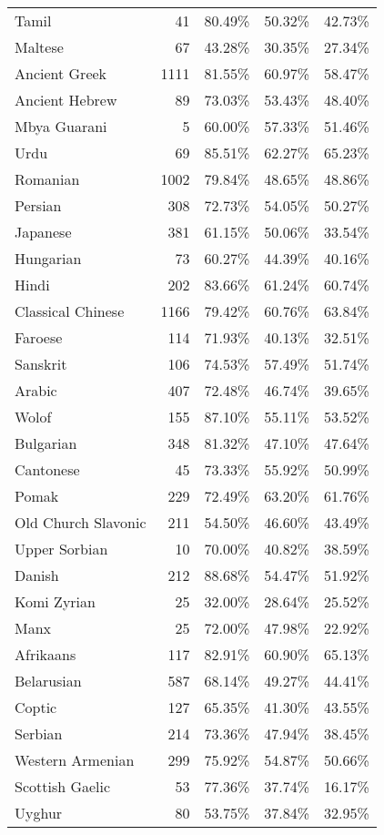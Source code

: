 \begin{longtable}{lrrrr}
    Tamil & 41 & 80.49\% & 50.32\% & 42.73\% \\
    Maltese & 67 & 43.28\% & 30.35\% & 27.34\% \\
    Ancient Greek & 1111 & 81.55\% & 60.97\% & 58.47\% \\
    Ancient Hebrew & 89 & 73.03\% & 53.43\% & 48.40\% \\
    Mbya Guarani & 5 & 60.00\% & 57.33\% & 51.46\% \\
    Urdu & 69 & 85.51\% & 62.27\% & 65.23\% \\
    Romanian & 1002 & 79.84\% & 48.65\% & 48.86\% \\
    Persian & 308 & 72.73\% & 54.05\% & 50.27\% \\
    Japanese & 381 & 61.15\% & 50.06\% & 33.54\% \\
    Hungarian & 73 & 60.27\% & 44.39\% & 40.16\% \\
    Hindi & 202 & 83.66\% & 61.24\% & 60.74\% \\
    Classical Chinese & 1166 & 79.42\% & 60.76\% & 63.84\% \\
    Faroese & 114 & 71.93\% & 40.13\% & 32.51\% \\
    Sanskrit & 106 & 74.53\% & 57.49\% & 51.74\% \\
    Arabic & 407 & 72.48\% & 46.74\% & 39.65\% \\
    Wolof & 155 & 87.10\% & 55.11\% & 53.52\% \\
    Bulgarian & 348 & 81.32\% & 47.10\% & 47.64\% \\
    Cantonese & 45 & 73.33\% & 55.92\% & 50.99\% \\
    Pomak & 229 & 72.49\% & 63.20\% & 61.76\% \\
    Old Church Slavonic & 211 & 54.50\% & 46.60\% & 43.49\% \\
    Upper Sorbian & 10 & 70.00\% & 40.82\% & 38.59\% \\
    Danish & 212 & 88.68\% & 54.47\% & 51.92\% \\
    Komi Zyrian & 25 & 32.00\% & 28.64\% & 25.52\% \\
    Manx & 25 & 72.00\% & 47.98\% & 22.92\% \\
    Afrikaans & 117 & 82.91\% & 60.90\% & 65.13\% \\
    Belarusian & 587 & 68.14\% & 49.27\% & 44.41\% \\
    Coptic & 127 & 65.35\% & 41.30\% & 43.55\% \\
    Serbian & 214 & 73.36\% & 47.94\% & 38.45\% \\
    Western Armenian & 299 & 75.92\% & 54.87\% & 50.66\% \\
    Scottish Gaelic & 53 & 77.36\% & 37.74\% & 16.17\% \\
    Uyghur & 80 & 53.75\% & 37.84\% & 32.95\% \\
\end{longtable}
    